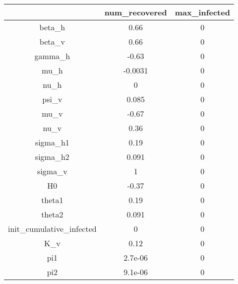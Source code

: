 \begin{tabular}{|c|c|c|}
\hline
& num_recovered & max_infected \\
\hline
beta_h & 0.66 & 0 \\
\hline
beta_v & 0.66 & 0 \\
\hline
gamma_h & -0.63 & 0 \\
\hline
mu_h & -0.0031 & 0 \\
\hline
nu_h & 0 & 0 \\
\hline
psi_v & 0.085 & 0 \\
\hline
mu_v & -0.67 & 0 \\
\hline
nu_v & 0.36 & 0 \\
\hline
sigma_h1 & 0.19 & 0 \\
\hline
sigma_h2 & 0.091 & 0 \\
\hline
sigma_v & 1 & 0 \\
\hline
H0 & -0.37 & 0 \\
\hline
theta1 & 0.19 & 0 \\
\hline
theta2 & 0.091 & 0 \\
\hline
init_cumulative_infected & 0 & 0 \\
\hline
K_v & 0.12 & 0 \\
\hline
pi1 & 2.7e-06 & 0 \\
\hline
pi2 & 9.1e-06 & 0 \\
\hline
\end{tabular}
